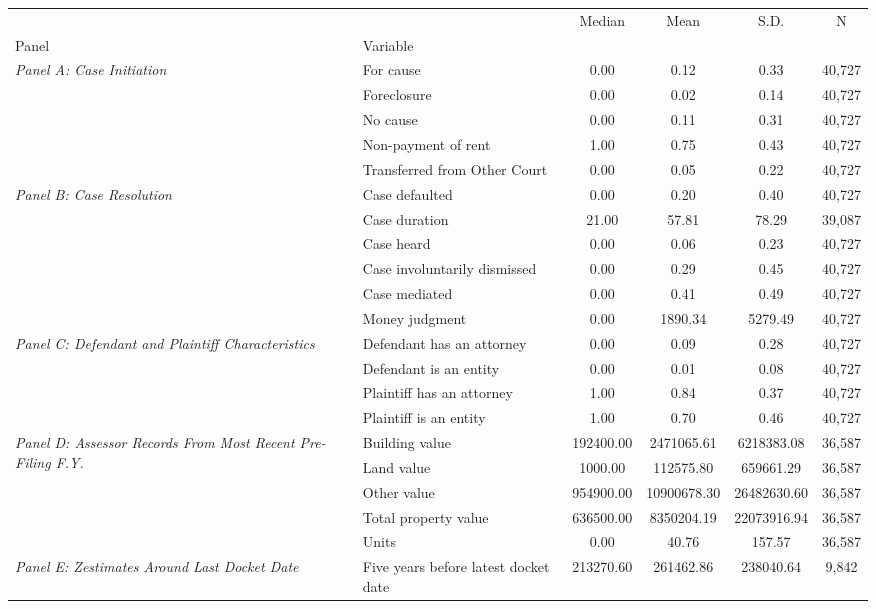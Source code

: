 \begin{tabular}{llcccc}
\toprule
 &  & Median & Mean & S.D. & N \\
Panel & Variable &  &  &  &  \\
\midrule
\multirow[c]{5}{4cm}{\textit{Panel A: Case Initiation}} & For cause & 0.00 & 0.12 & 0.33 & 40,727 \\
 & Foreclosure & 0.00 & 0.02 & 0.14 & 40,727 \\
 & No cause & 0.00 & 0.11 & 0.31 & 40,727 \\
 & Non-payment of rent & 1.00 & 0.75 & 0.43 & 40,727 \\
 & Transferred from Other Court & 0.00 & 0.05 & 0.22 & 40,727 \\
\cline{1-6}
\multirow[c]{6}{4cm}{\textit{Panel B: Case Resolution}} & Case defaulted & 0.00 & 0.20 & 0.40 & 40,727 \\
 & Case duration & 21.00 & 57.81 & 78.29 & 39,087 \\
 & Case heard & 0.00 & 0.06 & 0.23 & 40,727 \\
 & Case involuntarily dismissed & 0.00 & 0.29 & 0.45 & 40,727 \\
 & Case mediated & 0.00 & 0.41 & 0.49 & 40,727 \\
 & Money judgment & 0.00 & 1890.34 & 5279.49 & 40,727 \\
\cline{1-6}
\multirow[c]{4}{4cm}{\textit{Panel C: Defendant and Plaintiff Characteristics}} & Defendant has an attorney & 0.00 & 0.09 & 0.28 & 40,727 \\
 & Defendant is an entity & 0.00 & 0.01 & 0.08 & 40,727 \\
 & Plaintiff has an attorney & 1.00 & 0.84 & 0.37 & 40,727 \\
 & Plaintiff is an entity & 1.00 & 0.70 & 0.46 & 40,727 \\
\cline{1-6}
\multirow[c]{5}{4cm}{\textit{Panel D: Assessor Records From Most Recent Pre-Filing F.Y.}} & Building value & 192400.00 & 2471065.61 & 6218383.08 & 36,587 \\
 & Land value & 1000.00 & 112575.80 & 659661.29 & 36,587 \\
 & Other value & 954900.00 & 10900678.30 & 26482630.60 & 36,587 \\
 & Total property value & 636500.00 & 8350204.19 & 22073916.94 & 36,587 \\
 & Units & 0.00 & 40.76 & 157.57 & 36,587 \\
\cline{1-6}
\multirow[c]{9}{4cm}{\textit{Panel E: Zestimates Around Last Docket Date}} & Five years before latest docket date & 213270.60 & 261462.86 & 238040.64 & 9,842 \\

\end{tabular}
